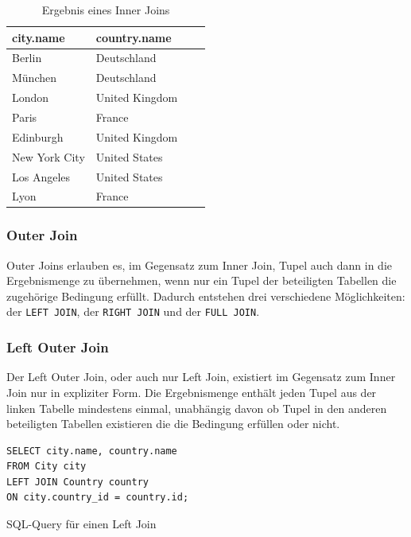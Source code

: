 \documentclass[a4paper]{article}
\begin{document}
\begin{minipage}{\textwidth}
\begin{minipage}[b]{0.49\textwidth}
\end{minipage}
\hfill
\begin{minipage}[b]{0.49\textwidth}
\begin{table}[H]
\centering
  \begin{tabular}{| l | l | l | l |}
    \hline
    city.name & country.name\\ \hline
    \hline
   Berlin & Deutschland \\ \hline
   München & Deutschland \\ \hline
   London & United Kingdom \\ \hline
   Paris & France \\ \hline
   Edinburgh & United Kingdom \\ \hline
   New York City & United States \\ \hline
   Los Angeles & United States \\ \hline
   Lyon & France \\ \hline
  \end{tabular}
\caption{Ergebnis eines Inner Joins}
\label{tab:inner-join}
\end{table}
\end{minipage}
\end{minipage}

\subsubsection{Outer Join}
Outer Joins erlauben es, im Gegensatz zum Inner Join, Tupel auch dann in die Ergebnismenge zu übernehmen, wenn nur ein Tupel der beteiligten Tabellen die zugehörige Bedingung erfüllt. Dadurch entstehen drei verschiedene Möglichkeiten: der \texttt{LEFT JOIN}, der \texttt{RIGHT JOIN} und der \texttt{FULL JOIN}.

\subsubsection{Left Outer Join}
\label{sec:left-join}
Der Left Outer Join, oder auch nur Left Join, existiert im Gegensatz zum Inner Join nur in expliziter Form. Die Ergebnismenge enthält jeden Tupel aus der linken Tabelle mindestens einmal, unabhängig davon ob Tupel in den anderen beteiligten Tabellen existieren die die Bedingung erfüllen oder nicht.

\begin{listing}[H]
\begin{verbatim}
SELECT city.name, country.name 
FROM City city
LEFT JOIN Country country 
ON city.country_id = country.id;
\end{verbatim}
\caption{SQL-Query für einen Left Join}
\label{lst:left-join}
\end{listing}
\end{document}
